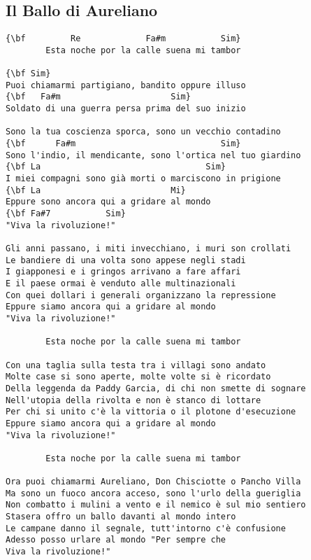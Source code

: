 \documentclass[a4paper]{article}
\begin{document}
\subsection{Il Ballo di Aureliano} %
\label{sub:Il Ballo di Aureliano}
\begin{Verbatim}[commandchars=\\\{\}]
{\bf         Re             Fa#m           Sim}
        Esta noche por la calle suena mi tambor

{\bf Sim}
Puoi chiamarmi partigiano, bandito oppure illuso
{\bf   Fa#m                      Sim}
Soldato di una guerra persa prima del suo inizio

Sono la tua coscienza sporca, sono un vecchio contadino
{\bf      Fa#m                             Sim}
Sono l'indio, il mendicante, sono l'ortica nel tuo giardino
{\bf La                                 Sim}
I miei compagni sono già morti o marciscono in prigione
{\bf La                          Mi}
Eppure sono ancora qui a gridare al mondo
{\bf Fa#7           Sim}
"Viva la rivoluzione!"

Gli anni passano, i miti invecchiano, i muri son crollati
Le bandiere di una volta sono appese negli stadi
I giapponesi e i gringos arrivano a fare affari
E il paese ormai è venduto alle multinazionali
Con quei dollari i generali organizzano la repressione
Eppure siamo ancora qui a gridare al mondo
"Viva la rivoluzione!"

        Esta noche por la calle suena mi tambor

Con una taglia sulla testa tra i villagi sono andato
Molte case si sono aperte, molte volte si è ricordato
Della leggenda da Paddy Garcia, di chi non smette di sognare
Nell'utopia della rivolta e non è stanco di lottare
Per chi si unito c'è la vittoria o il plotone d'esecuzione
Eppure siamo ancora qui a gridare al mondo
"Viva la rivoluzione!"

        Esta noche por la calle suena mi tambor

Ora puoi chiamarmi Aureliano, Don Chisciotte o Pancho Villa
Ma sono un fuoco ancora acceso, sono l'urlo della gueriglia
Non combatto i mulini a vento e il nemico è sul mio sentiero
Stasera offro un ballo davanti al mondo intero
Le campane danno il segnale, tutt'intorno c'è confusione
Adesso posso urlare al mondo "Per sempre che
Viva la rivoluzione!"
\end{Verbatim}
\newpage
\end{document}
